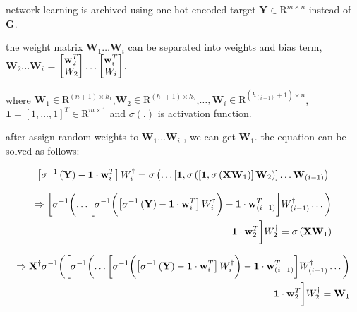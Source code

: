 \documentclass[runningheads]{llncs}
\begin{document}
network learning is archived using one-hot encoded target $\mathbf{Y}\in{\mathrm{R}}^{m \times n}$ instead of $\mathbf{G}$.


the weight matrix $\mathbf{W}_{1}\dots\mathbf{W}_{i}$ can be separated into weights and bias term,
$\mathbf{W}_{2}\dots\mathbf{W}_{i}$ = 
$\begin{bmatrix}
\mathbf{w}_{2}^{T}\\\mathnormal{W}_{2}
\end{bmatrix}
\dots
\begin{bmatrix}
\mathbf{w}_{i}^{T}\\\mathnormal{W}_{i}
\end{bmatrix}$.

where $\mathbf{W}_{1}\in{\mathrm{R}}^{(n+1) \times h_{1}}$,$\mathbf{W}_{2}\in{\mathrm{R}}^{(h_{1}+1) \times h_{2}}$,$\dots,\mathbf{W}_{i}\in{\mathrm{R}}^{(h_{(i-1)}+1) \times n}$,
$\mathbf{1}=\left[1,\dots,1\right]^{T}\in{\mathrm{R}}^{m \times 1}$
and $\sigma(.)$ is activation function.


after assign random weights to $\mathbf{W}_{1}\dots\mathbf{W}_{i}$ , we can get $\mathbf{W}_{1}$. the equation can be solved as follows:

\begin{equation}
\left[\sigma^{-1}\left(\mathbf{Y}\right)-\mathbf{1}\cdot\mathbf{w}_{i}^{T}\right]\mathnormal{W}_{i}^\dagger = 
\sigma\left(\dots\left[\mathbf{1},\sigma\left(\left[\mathbf{1},\sigma\left(\mathbf{X}\mathbf{W}_{1}\right)\right]\mathbf{W}_{2}\right)\right]\dots\mathbf{W}_{(i-1)}\right)
\end{equation}


\begin{equation}
\begin{aligned}
\Rightarrow
\biggl[\sigma^{-1}\biggl(
\dots
\biggl[\sigma^{-1}\biggl(
    \left[\sigma^{-1}\left(\mathbf{Y}\right)-\mathbf{1}\cdot\mathbf{w}_{i}^{T}\right]\mathnormal{W}_{i}^\dagger
\biggr)
- \mathbf{1}\cdot\mathbf{w}_{(i-1)}^{T}\biggr]\mathnormal{W}_{(i-1)}^{\dagger}
\dots\biggr)\\
- \mathbf{1}\cdot\mathbf{w}_{2}^{T}\biggr]\mathnormal{W}_{2}^{\dagger} 
= \sigma\left(\mathbf{X}\mathbf{W}_{1}\right)
\end{aligned}
\end{equation}


\begin{equation}
\begin{aligned}
\Rightarrow
\mathbf{X}^{\dagger}\sigma^{-1}\biggl(
\biggl[\sigma^{-1}\biggl(
\dots
\biggl[\sigma^{-1}\biggl(
    \left[\sigma^{-1}\left(\mathbf{Y}\right)-\mathbf{1}\cdot\mathbf{w}_{i}^{T}\right]\mathnormal{W}_{i}^\dagger
\biggr)
- \mathbf{1}\cdot\mathbf{w}_{(i-1)}^{T}\biggr]\mathnormal{W}_{(i-1)}^{\dagger}
\dots\biggr)\\
- \mathbf{1}\cdot\mathbf{w}_{2}^{T}\biggr]\mathnormal{W}_{2}^{\dagger}
= \mathbf{W}_{1}
\end{aligned}
\end{equation}
\end{document}
